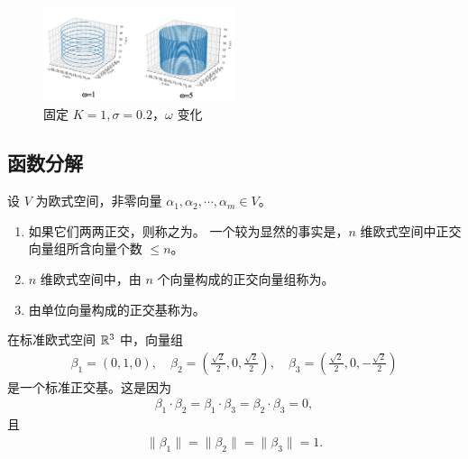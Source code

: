 \begin{property}[复指数信号与正余弦信号之间的关系]
\begin{figure}[H]
        \label{fig:complex-exponential-signal-sigma-vary}
    \end{figure}
    \begin{figure}[H]
        \centering
        \includegraphics[width=0.5\textwidth]{chap1/img/complex-exponential-signal-omega-vary.png}
        \caption{固定 $K = 1, \sigma = 0.2$，$\omega$ 变化}
        \label{fig:complex-exponential-signal-omega-vary}
    \end{figure}
\end{property}

\subsection{函数分解}

\begin{definition}[正交基]
    设 $V$ 为欧式空间，非零向量 $\alpha_1, \alpha_2, \cdots, \alpha_m \in V$。
    \begin{enumerate}
        \item 如果它们两两正交，则称之为。
            一个较为显然的事实是，$n$ 维欧式空间中正交向量组所含向量个数 $\le n$。
        \item $n$ 维欧式空间中，由 $n$ 个向量构成的正交向量组称为。
        \item 由单位向量构成的正交基称为。
    \end{enumerate}
\end{definition}

\begin{example}
    在标准欧式空间 $\mathbb{R}^3$ 中，向量组
    \begin{align*}
        \beta_1 = (0, 1, 0),
        \quad \beta_2 = (\frac{\sqrt{2}}{2}, 0, \frac{\sqrt{2}}{2}),
        \quad \beta_3 = (\frac{\sqrt{2}}{2}, 0, -\frac{\sqrt{2}}{2})
    \end{align*}
    是一个标准正交基。这是因为
    \begin{align*}
        \beta_1 \cdot \beta_2 = \beta_1 \cdot \beta_3 = \beta_2 \cdot \beta_3 = 0,
    \end{align*}
    且
    \begin{align*}
        \|\beta_1\| = \|\beta_2\| = \|\beta_3\| = 1.
    \end{align*}
\end{example}

